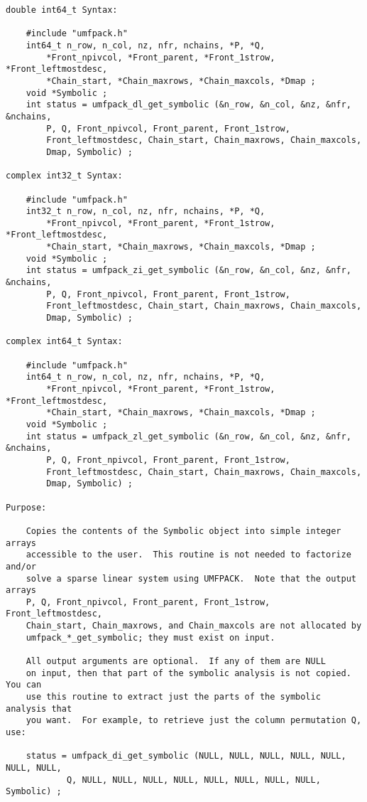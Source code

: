 \documentclass[11pt]{article}
\begin{document}
{\begin{verbatim}
double int64_t Syntax:

    #include "umfpack.h"
    int64_t n_row, n_col, nz, nfr, nchains, *P, *Q,
        *Front_npivcol, *Front_parent, *Front_1strow, *Front_leftmostdesc,
        *Chain_start, *Chain_maxrows, *Chain_maxcols, *Dmap ;
    void *Symbolic ;
    int status = umfpack_dl_get_symbolic (&n_row, &n_col, &nz, &nfr, &nchains,
        P, Q, Front_npivcol, Front_parent, Front_1strow,
        Front_leftmostdesc, Chain_start, Chain_maxrows, Chain_maxcols,
        Dmap, Symbolic) ;

complex int32_t Syntax:

    #include "umfpack.h"
    int32_t n_row, n_col, nz, nfr, nchains, *P, *Q,
        *Front_npivcol, *Front_parent, *Front_1strow, *Front_leftmostdesc,
        *Chain_start, *Chain_maxrows, *Chain_maxcols, *Dmap ;
    void *Symbolic ;
    int status = umfpack_zi_get_symbolic (&n_row, &n_col, &nz, &nfr, &nchains,
        P, Q, Front_npivcol, Front_parent, Front_1strow,
        Front_leftmostdesc, Chain_start, Chain_maxrows, Chain_maxcols,
        Dmap, Symbolic) ;

complex int64_t Syntax:

    #include "umfpack.h"
    int64_t n_row, n_col, nz, nfr, nchains, *P, *Q,
        *Front_npivcol, *Front_parent, *Front_1strow, *Front_leftmostdesc,
        *Chain_start, *Chain_maxrows, *Chain_maxcols, *Dmap ;
    void *Symbolic ;
    int status = umfpack_zl_get_symbolic (&n_row, &n_col, &nz, &nfr, &nchains,
        P, Q, Front_npivcol, Front_parent, Front_1strow,
        Front_leftmostdesc, Chain_start, Chain_maxrows, Chain_maxcols,
        Dmap, Symbolic) ;

Purpose:

    Copies the contents of the Symbolic object into simple integer arrays
    accessible to the user.  This routine is not needed to factorize and/or
    solve a sparse linear system using UMFPACK.  Note that the output arrays
    P, Q, Front_npivcol, Front_parent, Front_1strow, Front_leftmostdesc,
    Chain_start, Chain_maxrows, and Chain_maxcols are not allocated by
    umfpack_*_get_symbolic; they must exist on input.

    All output arguments are optional.  If any of them are NULL
    on input, then that part of the symbolic analysis is not copied.  You can
    use this routine to extract just the parts of the symbolic analysis that
    you want.  For example, to retrieve just the column permutation Q, use:

    status = umfpack_di_get_symbolic (NULL, NULL, NULL, NULL, NULL, NULL, NULL,
            Q, NULL, NULL, NULL, NULL, NULL, NULL, NULL, NULL, Symbolic) ;


\end{verbatim}}
\end{document}

